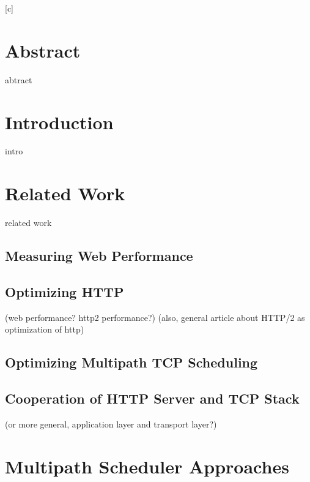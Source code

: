 \documentclass[article,type=bsc,colorback,accentcolor=tud9c]{tudthesis}
\begin{document}
  \author{Maxi Weller}
  [c]
  \makethesistitle


  \section*{Abstract}
abtract

\renewcommand{\contentsname}{Contents}
 \tableofcontents

  \section{Introduction}
intro

  \section{Related Work}
related work

  \subsection{Measuring Web Performance}
\cite{han2015mwebmptcp}


  \subsection{Optimizing HTTP}
(web performance? http2 performance?)
\cite{klotski2015}
(also, general article about HTTP/2 as optimization of http)
\cite{rfc7540}


  \subsection{Optimizing Multipath TCP Scheduling}
\cite{multipathtcp}


  \subsection{Cooperation of HTTP Server and TCP Stack}
(or more general, application layer and transport layer?)

\cite{Raisinghani_2004}
\cite{nowlan2012unorderedtcp}



\section{Multipath Scheduler Approaches}
\end{document}
